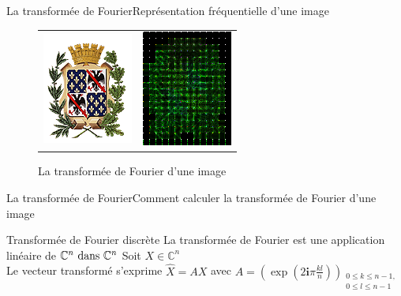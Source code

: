 \begin{frame}{La transformée de Fourier}{Représentation fréquentielle d'une image}
	\begin{figure}
		\begin{tabular}{ c c }
			\includegraphics[scale=1.2]{images/TF/exemples_diapo_2/blason-cachan.png} &
			\includegraphics[scale=1.2]{images/TF/exemples_diapo_2/blason-cachan_tf_couleur.png}
		\end{tabular}
		\caption{La transformée de Fourier d'une image}
	\end{figure}
\end{frame}


\begin{frame}{La transformée de Fourier}{Comment calculer la transformée de Fourier d'une image}
	\begin{block}{Transformée de Fourier discrète}
		La transformée de Fourier est une application linéaire de \(\mathbb{C}^n$ dans $\mathbb{C}^n\)
		Soit \(X\in\mathbb{C}^n\) \\
		Le vecteur transformé s'exprime \(\widehat{X} = AX\) avec \(A = {\left(\exp\left(2\mathbf{i}\pi\frac{kl}{n}\right)\right)}_{\substack{0 \leqslant k \leqslant n-1,\\ 0 \leqslant l \leqslant n-1}}\)
	\end{block}
\end{frame}

